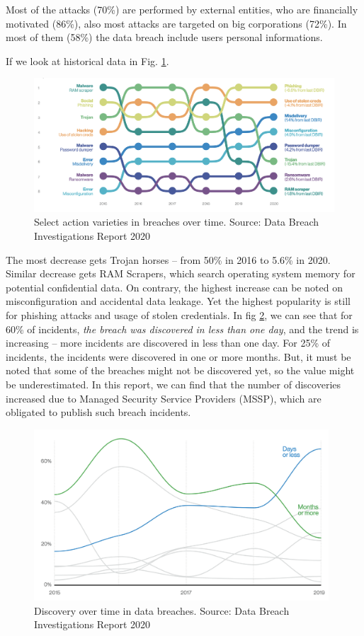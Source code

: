 \documentclass[nostrict]{szablonPG}
\begin{document}
Most of the attacks (70\%) are performed by external entities, who are financially motivated (86\%), also most attacks are targeted on big corporations (72\%). In most of them (58\%) the data breach include users personal informations.  

If we look at historical data in Fig. \ref{fig:data-breach-historical}.
\begin{figure}[h!]
    \includegraphics[width=1\textwidth]{img/data-breach-historical.png}
    \centering
    \caption{Select action varieties in breaches over time. Source: Data Breach Investigations Report 2020}
    \label{fig:data-breach-historical}
\end{figure} 
The most decrease gets Trojan horses -- from 50\% in 2016 to 5.6\% in 2020. Similar decrease gets RAM Scrapers, which search operating system memory for potential confidential data. 
On contrary, the highest increase can be noted on misconfiguration and accidental data leakage. Yet the highest popularity is still for phishing attacks and usage of stolen credentials. 
In fig \ref{fig:credentials-steal-discovery}, we can see that for 60\% of incidents, \textit{the breach was discovered in less than one day}, and the trend is increasing -- more incidents are discovered in less than one day. For 25\% of incidents, the incidents were discovered in one or more months. But, it must be noted that some of the breaches might not be discovered yet, so the value might be underestimated. In this report, we can find that the number of discoveries increased due to Managed Security Service Providers (MSSP), which are obligated to publish such breach incidents.

\begin{figure}[h!]
    \includegraphics[width=11cm]{img/credentials-steal-discovery.png}
    \centering
    \caption{Discovery over time in data breaches. Source: Data Breach Investigations Report 2020}
    \label{fig:credentials-steal-discovery}
\end{figure} 
\end{document}
